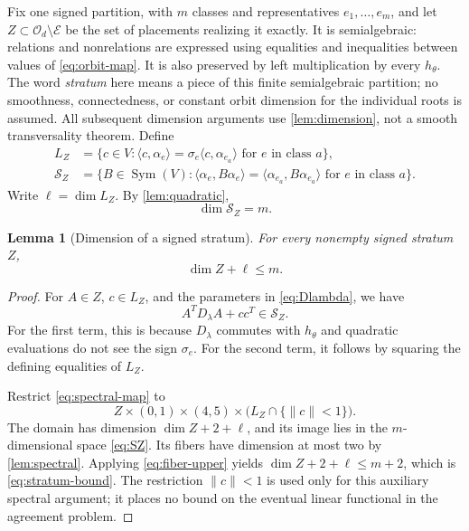 \documentclass[11pt,reqno]{amsart}
\newtheorem{lemma}[lemma]{Lemma}
\theoremstyle{definition}
\theoremstyle{remark}
\numberwithin{equation}{section}
\newcommand{\Orth}{\mathcal O_d}
\newcommand{\Exc}{\mathcal E}
\newcommand{\ip}[2]{\langle #1,#2\rangle}
\newcommand{\norm}[1]{\lVert #1\rVert}
\DeclareMathOperator{\Sym}{Sym}
\begin{document}
Fix one signed partition, with $m$ classes and representatives
$e_1,\ldots,e_m$, and let $Z\subset\Orth\setminus\Exc$ be the set
of placements realizing it exactly. It is semialgebraic: relations
and nonrelations are expressed using equalities and inequalities
between values of \eqref{eq:orbit-map}. It is also preserved by
left multiplication by every $h_\theta$. The word \emph{stratum} here
means a piece of this finite semialgebraic partition; no smoothness,
connectedness, or constant orbit dimension for the individual roots is
assumed. All subsequent dimension arguments use \cref{lem:dimension},
not a smooth transversality theorem.
Define
\begin{align}
 L_Z&=\{c\in V:\ip{c}{\alpha_e}
       =\sigma_e\ip{c}{\alpha_{e_a}}
       \text{ for }e\text{ in class }a\},
       \label{eq:LZ}\\
 \mathscr S_Z&=\{B\in\Sym(V):
       \ip{\alpha_e}{B\alpha_e}
       =\ip{\alpha_{e_a}}{B\alpha_{e_a}}
       \text{ for }e\text{ in class }a\}.
       \label{eq:SZ}
\end{align}
Write $\ell=\dim L_Z$. By \cref{lem:quadratic},
\begin{equation}\label{eq:Sdim}
 \dim\mathscr S_Z=m.
\end{equation}

\begin{lemma}[Dimension of a signed stratum]\label{lem:stratum}
For every nonempty signed stratum $Z$,
\begin{equation}\label{eq:stratum-bound}
 \dim Z+\ell\leq m.
\end{equation}
\end{lemma}
\begin{proof}
For $A\in Z$, $c\in L_Z$, and the parameters in \eqref{eq:Dlambda},
we have
\begin{equation}\label{eq:image-in-S}
 A^TD_\lambda A+cc^T\in\mathscr S_Z.
\end{equation}
For the first term, this is because $D_\lambda$ commutes with
$h_\theta$ and quadratic evaluations do not see the sign $\sigma_e$.
For the second term, it follows by squaring the defining equalities
of $L_Z$.

Restrict \eqref{eq:spectral-map} to
\[
 Z\times(0,1)\times(4,5)
       \times\bigl(L_Z\cap\{\norm c<1\}\bigr).
\]
The domain has dimension $\dim Z+2+\ell$, and its image lies in
the $m$-dimensional space \eqref{eq:SZ}. Its fibers have dimension
at most two by \cref{lem:spectral}. Applying
\eqref{eq:fiber-upper} yields
$\dim Z+2+\ell\leq m+2$, which is \eqref{eq:stratum-bound}.
The restriction $\norm c<1$ is used only for this auxiliary
spectral argument; it places no bound on the eventual linear
functional in the agreement problem.
\end{proof}
\end{document}
